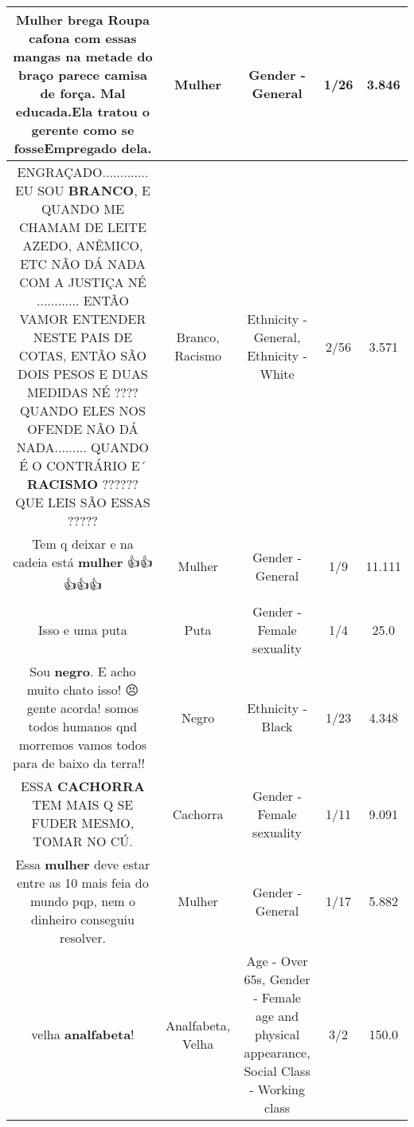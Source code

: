 \documentclass[11pt]{article}
\newlength\mylength
\begin{document}
\begin{center}
\begin{longtable}{|C{.65\mylength}|C{.30\mylength}|C{.12\mylength}|C{.12\mylength}|C{.12\mylength}|}
  \small Mulher brega Roupa cafona com essas mangas na metade do braço parece camisa de força.   Mal educada.Ela tratou o gerente como se fosseEmpregado dela.\normalsize   & Mulher & Gender - General & 1/26 & 3.846 \\  \hline
  \small ENGRAÇADO.............    EU SOU \textbf{BRANCO}, E QUANDO ME CHAMAM DE LEITE AZEDO,  ANÊMICO,  ETC NÃO DÁ NADA COM A JUSTIÇA NÉ ............    ENTÃO VAMOR ENTENDER NESTE PAIS DE COTAS, ENTÃO SÃO DOIS PESOS E DUAS MEDIDAS NÉ ????   QUANDO ELES NOS OFENDE NÃO DÁ NADA.........   QUANDO É O CONTRÁRIO E´ \textbf{RACISMO}   ??????   QUE LEIS SÃO ESSAS ?????\normalsize   & Branco, Racismo & Ethnicity - General, Ethnicity - White & 2/56 & 3.571 \\  \hline
  \small Tem q deixar e na cadeia está \textbf{mulher} 👍👍👍👍👍\normalsize   & Mulher & Gender - General & 1/9 & 11.111 \\  \hline
  \small Isso e uma puta\normalsize   & Puta & Gender - Female sexuality & 1/4 & 25.0 \\  \hline
  \small Sou \textbf{negro}. E acho muito chato isso! 😣 gente acorda! somos todos humanos qnd morremos vamos todos para de baixo da terra!! 🔰\normalsize   & Negro & Ethnicity - Black & 1/23 & 4.348 \\  \hline
  \small ESSA \textbf{CACHORRA} TEM MAIS Q SE FUDER MESMO, TOMAR NO CÚ.\normalsize   & Cachorra & Gender - Female sexuality & 1/11 & 9.091 \\  \hline
  \small Essa \textbf{mulher} deve estar entre as 10 mais feia do mundo pqp, nem o dinheiro conseguiu resolver.\normalsize   & Mulher & Gender - General & 1/17 & 5.882 \\  \hline
  \small velha \textbf{analfabeta}!\normalsize   & Analfabeta, Velha & Age - Over 65s, Gender - Female age and physical appearance, Social Class - Working class & 3/2 & 150.0 \\  \hline

\end{longtable}
\end{center}
\end{document}
